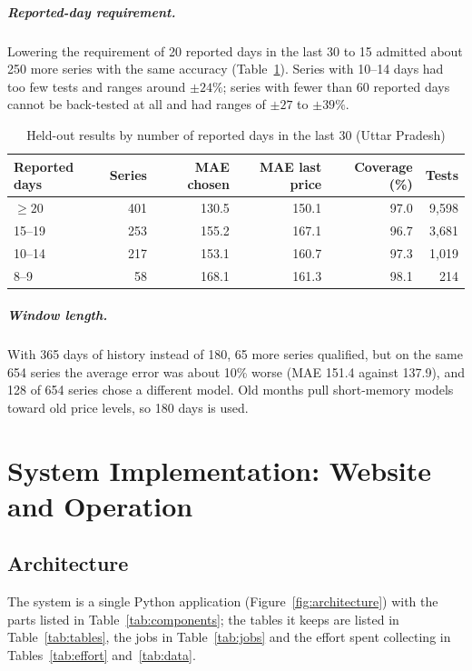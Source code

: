 \documentclass[12pt,a4paper,oneside]{report}
\numberwithin{equation}{chapter}
\numberwithin{figure}{chapter}
\numberwithin{table}{chapter}
\theoremstyle{definition}
\begin{document}
\paragraph{Reported-day requirement.} Lowering the requirement of 20 reported days in the last 30 to 15 admitted about 250 more series with the same accuracy (Table~\ref{tab:gate}). Series with 10--14 days had too few tests and ranges around $\pm 24\%$; series with fewer than 60 reported days cannot be back-tested at all and had ranges of $\pm 27$ to $\pm 39\%$.

\begin{table}[H]
\centering
\caption{Held-out results by number of reported days in the last 30 (Uttar Pradesh)}
\label{tab:gate}
\small
\begin{tabular}{@{}lrrrrr@{}}
\toprule
Reported days & Series & MAE chosen & MAE last price & Coverage (\%) & Tests \\
\midrule
$\ge 20$ & 401 & 130.5 & 150.1 & 97.0 & 9{,}598 \\
15--19 & 253 & 155.2 & 167.1 & 96.7 & 3{,}681 \\
10--14 & 217 & 153.1 & 160.7 & 97.3 & 1{,}019 \\
8--9 & 58 & 168.1 & 161.3 & 98.1 & 214 \\
\bottomrule
\end{tabular}
\end{table}

\paragraph{Window length.} With 365 days of history instead of 180, 65 more series qualified, but on the same 654 series the average error was about 10\% worse (MAE 151.4 against 137.9), and 128 of 654 series chose a different model. Old months pull short-memory models toward old price levels, so 180 days is used.

\chapter{System Implementation: Website and Operation}

\section{Architecture}
The system is a single Python application (Figure~\ref{fig:architecture}) with the parts listed in Table~\ref{tab:components}; the tables it keeps are listed in Table~\ref{tab:tables}, the jobs in Table~\ref{tab:jobs} and the effort spent collecting in Tables~\ref{tab:effort} and~\ref{tab:data}.
\end{document}
